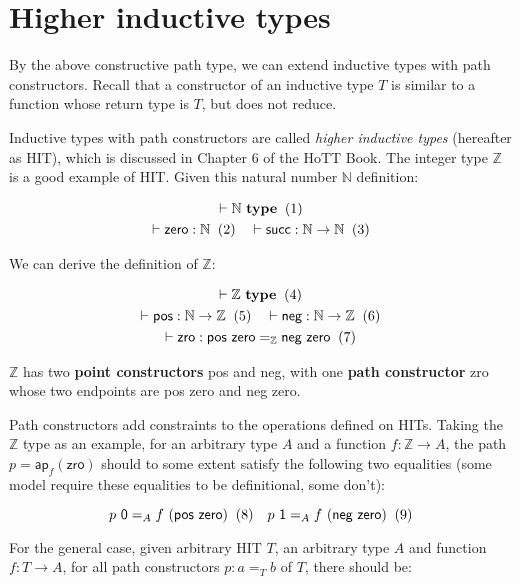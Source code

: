 \section{Higher inductive types}
\label{sec:hit}

By the above constructive path type,
we can extend inductive types with path constructors.
Recall that a constructor of an inductive type $T$ is
similar to a function whose return type is $T$,
but does not reduce.

Inductive types with path constructors are called
\textit{higher inductive types} (hereafter as HIT),
which is discussed in Chapter 6 of the HoTT Book.
The integer type $\mathbb Z$ is a good example of HIT.
Given this natural number $\mathbb N$ definition:

\begin{gather*}
  \vdash \mathbb N \ \textbf{type}
  \xtag
  \\
  \vdash \textsf{zero} : \mathbb N
  \xtag
  \quad
  \vdash \textsf{succ} : \mathbb N \rightarrow \mathbb N
  \xtag
  \\
\end{gather*}

We can derive the definition of $\mathbb Z$:

\begin{gather*}
  \vdash \mathbb Z \ \textbf{type}
  \xtag
  \\
  \vdash \textsf{pos} : \mathbb N \rightarrow \mathbb Z
  \xtag
  \quad
  \vdash \textsf{neg} : \mathbb N \rightarrow \mathbb Z
  \xtag
  \\
  \vdash \textsf{zro} :
  \textsf{pos zero} =_{\mathbb Z} \textsf{neg zero}
  \xtag
\end{gather*}

$\mathbb Z$ has two \textbf{point constructors}
\textsf{pos} and \textsf{neg}, with one \textbf{path constructor}
\textsf{zro} whose two endpoints are \textsf{pos zero} and \textsf{neg zero}.

Path constructors add constraints to the operations defined on HITs.
Taking the $\mathbb Z$ type as an example,
for an arbitrary type $A$ and a function $f : \mathbb Z \rightarrow A$,
the path $p = \textsf{ap}_f(\textsf{zro})$ should to some extent
satisfy the following two equalities
(some model require these equalities to be definitional, some don't):

\[
  p\ \textsf 0 =_A f\ (\textsf{pos zero})
  \xtag
  \quad
  p\ \textsf 1 =_A f\ (\textsf{neg zero})
  \xtag
\]

For the general case, given arbitrary HIT $T$, an arbitrary type $A$ and
function $f : T \rightarrow A$, for all path constructors
$p : a =_T b$ of $T$, there should be:

